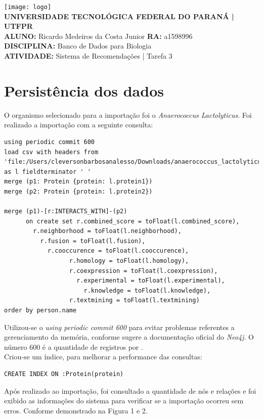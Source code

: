 \documentclass[a4paper, 12pt]{article}
\begin{document}
\lstset{language=SQL}
\begin{flushleft}\texttt{[image: logo]}\\
\textbf{UNIVERSIDADE TECNOLÓGICA FEDERAL DO PARANÁ | UTFPR} \\
\textbf{ALUNO:} Ricardo Medeiros da Costa Junior   \textbf{RA:} a1598996 \\
\textbf{DISCIPLINA:} Banco de Dados para Biologia \\
\textbf{ATIVIDADE:} Sistema de Recomendações | Tarefa 3 

\section{Persistência dos dados}
O organismo selecionado para a importação foi o \emph{Anaerococcus Lactolyticus}. Foi realizado a importação com a seguinte consulta:

\begin{lstlisting}[frame=single]
using periodic commit 600
load csv with headers from 'file:/Users/cleversonbarbosanalesso/Downloads/anaerococcus_lactolyticus.csv' as l fieldterminator ' '
merge (p1: Protein {protein: l.protein1})
merge (p2: Protein {protein: l.protein2})

merge (p1)-[r:INTERACTS_WITH]-(p2)
      on create set r.combined_score = toFloat(l.combined_score),
        r.neighborhood = toFloat(l.neighborhood),
          r.fusion = toFloat(l.fusion),
            r.cooccurence = toFloat(l.cooccurence),
                  r.homology = toFloat(l.homology),
                  r.coexpression = toFloat(l.coexpression),
                    r.experimental = toFloat(l.experimental),
                      r.knowledge = toFloat(l.knowledge),
                  r.textmining = toFloat(l.textmining)
order by person.name
\end{lstlisting}

Utilizou-se o \emph{using periodic commit 600} para evitar problemas referentes a gerenciamento da memória, conforme sugere a documentação oficial do \emph{Neo4j}. O número 600 é a quantidade de registros por . \\

Criou-se um índice, para melhorar a performance das consultas:

\begin{lstlisting}[frame=single]
CREATE INDEX ON :Protein(protein)
\end{lstlisting}

Após realizado ao importação, foi consultado a quantidade de nós e relações e foi exibido as informações do sistema para verificar se a importação ocorreu sem erros. Conforme demonstrado na Figura 1 e 2.


\end{flushleft}
\end{document}
